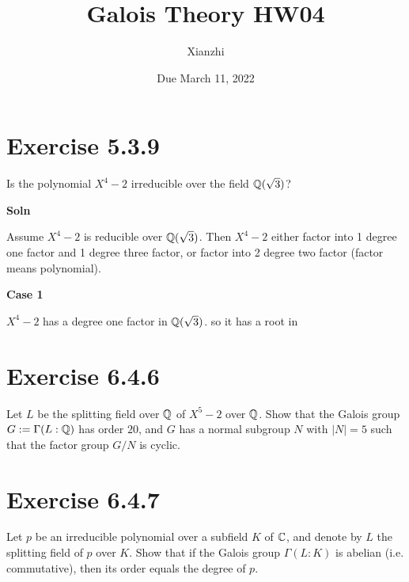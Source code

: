 \documentclass[12pt,english]{article}
\title{Galois Theory HW04}
\author{Xianzhi}
\date{Due March 11, 2022}
\begin{document}
\maketitle

\section*{Exercise 5.3.9}
\begin{question}
    Is the polynomial $X^4 -2$ irreducible over the field $\mathbb{Q}(\sqrt{3})$?
\end{question}

\textbf{Soln}

Assume $X^4 - 2$ is reducible over $\mathbb{Q}(\sqrt{3})$.
Then $X^4 -2$ either factor into 1 degree one factor and 1 degree three factor, or 
factor into 2 degree two factor (factor means polynomial).

\textbf{Case 1}

$X^4 -2$ has a degree one factor in $\mathbb{Q}(\sqrt{3})$. 
so it has a root in 


\section*{Exercise 6.4.6}
\begin{question}
    Let $L$ be the splitting field over $\mathbb{Q}$ of $X^5 - 2$ over $\mathbb{Q}$. 
    Show that the Galois group $G:=\Gamma(L:\mathbb{Q})$ has order $20$,
    and $G$ has a normal subgroup $N$ with $\lvert N \rvert = 5$
    such that the factor group $G/N$ is cyclic.
\end{question}

\section*{Exercise 6.4.7}
\begin{question}
    Let $p$ be an irreducible polynomial over a subfield $K$ of $\mathbb{C}$, and denote by $L$ the splitting field of $p$ over $K$. 
    Show that if the Galois group $\Gamma (L:K)$ is abelian (i.e. commutative), 
    then its order equals the degree of $p$.
\end{question}
\end{document}
